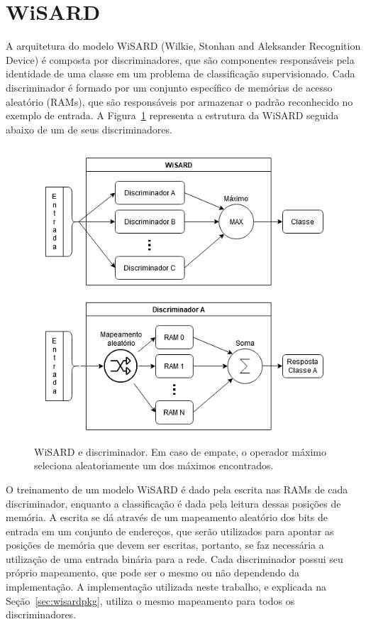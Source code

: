 \section{WiSARD}
A arquitetura do modelo WiSARD (Wilkie, Stonhan and Aleksander Recognition Device) é composta por discriminadores, que são componentes responsáveis pela identidade de uma classe em um problema de classificação supervisionado. Cada discriminador é formado por um conjunto específico de memórias de acesso aleatório (RAMs), que são responsáveis por armazenar o padrão reconhecido no exemplo de entrada. A Figura~\ref{fig:wsd_disc} representa a estrutura da WiSARD seguida abaixo de um de seus discriminadores.

\begin{figure}[!ht] \label{fig:wsd_disc}
    \centering
    \includegraphics[width=5.0in]{img/wisard_discriminator.png}
    \caption{WiSARD e discriminador. Em caso de empate, o operador máximo seleciona aleatoriamente um dos máximos encontrados.}
\end{figure}

O treinamento de um modelo WiSARD é dado pela escrita nas RAMs de cada discriminador, enquanto a classificação é dada pela leitura dessas posições de memória. A escrita se dá através de um mapeamento aleatório dos bits de entrada em um conjunto de endereços, que serão utilizados para apontar as posições de memória que devem ser escritas, portanto, se faz necessária a utilização de uma entrada binária para a rede. Cada discriminador possui seu próprio mapeamento, que pode ser o mesmo ou não dependendo da implementação. A implementação utilizada neste trabalho, e explicada na Seção~\ref{sec:wisardpkg}, utiliza o mesmo mapeamento para todos os discriminadores.

